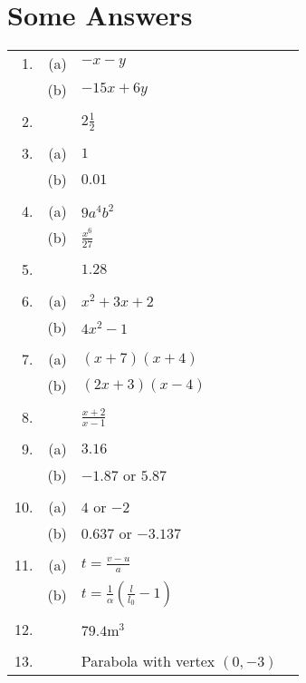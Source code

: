 \section{Some Answers}
\begin{tabular}[c]{rrlr}1.  & (a)
	& $ -x -y$  &  \\
	& (b)
	& $ -15 x +6 y$  &  \\
	&  &  &  \\
	2.
	&  & $2\frac{1}{2}$  &  \\
	&  &  &  \\
	3.
	& (a)  & $1$  &  \\
	& (b)
	& $0.01$  &  \\
	&  &  &  \\
	4.
	& (a)  & $9 a^{4} b^{2}$  &  \\
	& (b)
	& $\frac{x^{6}}{27}$  &  \\
	&  &  &  \\
	5.
	&  & $1.28$  &  \\
	&  &  &  \\
	6.
	& (a)  & $x^{2} +3 x +2$  &  \\
	& (b)
	& $4 x^{2} -1$  &  \\
	&  &  &  \\
	7.
	& (a)  & $\left (x +7\right ) \left (x +4\right )$  &  \\
	& (b)
	& $\left (2 x +3\right ) \left (x -4\right )$  &  \\
	&  &  &  \\
	8.
	&  & $\frac{x +2}{x -1}$  &  \\
	&  &  &  \\
	9.
	& (a)  & $3.16$  &  \\
	& (b)
	& $ -1.87$ or $5.87$  &  \\
	&  &  &  \\
	10.
	& (a)  & $4$ or $ -2$  &  \\
	& (b)
	& $0.637$ or $ -3.137$  &  \\
	&  &  &  \\
	11.
	& (a)  & $t =\frac{v -u}{a}$  &  \\
	& (b)
	& $t =\frac{1}{\alpha } \left (\frac{l}{l_{0}} -1\right )$  &  \\
	&  &  &  \\
	12.
	&  & $79.4 \mathrm{m}^{3}$  &  \\
	&  &  &  \\
	13.
	&  & Parabola with vertex $\left (0 , -3\right )$  & 
\end{tabular}

\relax    
\setlength\fboxrule{0.01in}\setlength\fboxsep{0.2in}
\\ 
\\



